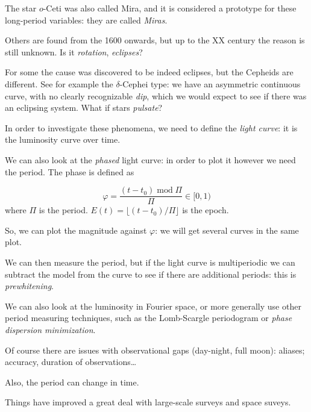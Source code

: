 \documentclass[main.tex]{subfiles}
\begin{document}
The star \(o\)-Ceti was also called Mira, and it is considered a prototype for these long-period variables: they are called \emph{Miras}.

Others are found from the 1600 onwards, but up to the XX century the reason is still unknown. Is it \emph{rotation}, \emph{eclipses}? 

For some the cause was discovered to be indeed eclipses, but the Cepheids are different. See for example the \(\delta\)-Cephei type: we have an asymmetric continuous curve, with no clearly recognizable \emph{dip}, which we would expect to see if there was an eclipsing system. 
What if stars \emph{pulsate}?

In order to investigate these phenomena, we need to define the \emph{light curve}: it is the luminosity curve over time.

We can also look at the \emph{phased} light curve: in order to plot it however we need the period. 
The phase is defined as 

\begin{equation}
    \varphi = \frac{(t-t_0) \operatorname{mod} \Pi}{\Pi} \in [0,1)
\end{equation}
%
where \(\Pi\) is the period.
\(E(t) = \lfloor (t-t_0 )/ \Pi \rfloor\) is the epoch.

So, we can plot the magnitude against \(\varphi \): we will get several curves in the same plot.

We can then measure the period, but if the light curve is multiperiodic we can subtract the model from the curve to see if there are additional periods: this is \emph{prewhitening}.

We can also look at the luminosity in Fourier space, or more generally use other period measuring techniques, such as the Lomb-Scargle periodogram or \emph{phase dispersion minimization}.


Of course there are issues with observational gaps (day-night, full moon): aliases; accuracy, duration of observations\dots

Also, the period can change in time.

Things have improved a great deal with large-scale surveys and space suveys.
\end{document}
